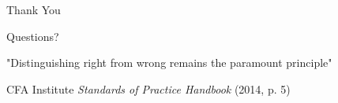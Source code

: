 \documentclass{beamer}
\begin{document}
	\begin{frame}{Thank You}
		\begin{center}
			\Huge \textcolor{cfablue}{Questions?}
			
			\vspace{0.5cm}
			\Large \textcolor{cfagold}{"Distinguishing right from wrong remains the paramount principle"}
			
			\vspace{0.5cm}
			\normalsize CFA Institute \textit{Standards of Practice Handbook} (2014, p. 5)
		\end{center}
	\end{frame}
	
\end{document}
